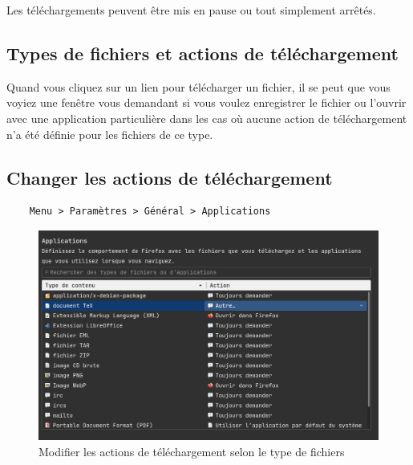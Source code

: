 \documentclass[a4paper,11pt]{book}
\begin{document}
Les téléchargements peuvent être mis en pause ou tout simplement arrêtés.
\medskip

\subsection*{Types de fichiers et actions de téléchargement}
Quand vous cliquez sur un lien pour télécharger un fichier, il se peut que vous voyiez une fenêtre vous demandant si vous voulez enregistrer le fichier ou l’ouvrir avec une application particulière dans les cas où aucune action de téléchargement n’a été définie pour les fichiers de ce type.
\medskip

\subsection*{Changer les actions de téléchargement}
\begin{verbatim}
    Menu > Paramètres > Général > Applications
\end{verbatim}
\medskip

\begin{figure}[!h]
\begin{center}
\includegraphics[scale=0.37]{IMG/009--Telechargement.png}
\caption{Modifier les actions de téléchargement selon le type de fichiers}
\end{center}
\end{figure}
\medskip
\end{document}
